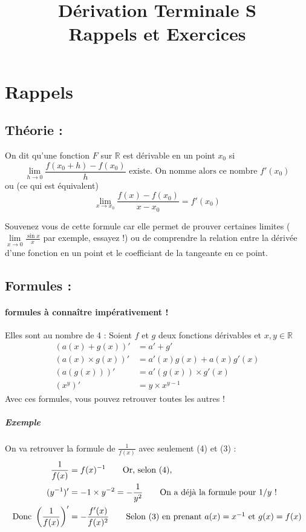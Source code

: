 \documentclass[11pt]{article}
\title{Dérivation Terminale S\\
        \large Rappels et Exercices}
\date{}
\author{}
\newcommand{\R}{\mathbb R}
\begin{document}
    
    \maketitle
    
    \section{Rappels}
        \subsection{Théorie :}
        On dit qu'une fonction $F$ sur $\R$ est dérivable en un point $x_0$ si
        \begin{equation}
            \lim\limits_{h \to 0} \frac{f(x_0 + h)-f(x_0)}{h} \text{ existe. On nomme alors ce nombre $f'(x_0)$} 
        \end{equation}
        ou (ce qui est équivalent)
        \begin{equation*}
            \lim\limits_{x \to x_0} \frac{f(x)-f(x_0)}{x-x_0} = f'(x_0)            
        \end{equation*}

        Souvenez vous de cette formule car elle permet de prouver certaines limites ($\lim\limits_{x \to 0} \frac{\sin{x}}{x}$ par exemple, essayez !) ou de comprendre la relation entre la dérivée d'une fonction en un point et le coefficiant de la tangeante en ce point.

        \subsection{Formules :}
        \paragraph{formules à connaître impérativement !}
        Elles sont au nombre de 4 : Soient $f$ et $g$ deux fonctions dérivables et $x,y \in  \R $
        \begin{align}
            (a(x) + g(x))' &= a' +g'\\
            (a(x) \times g(x))' &= a'(x)g(x) + a(x)g'(x)\\
            (a(g(x)))' &= a'(g(x))\times g'(x)\\
            (x^y)' &= y\times x^{y-1}
        \end{align}
        Avec ces formules, vous pouvez retrouver toutes les autres !
        \subparagraph{Exemple} On va retrouver la formule de $\frac{1}{f(x)}$ avec seulement (4) et (3) :
        \begin{align*}
            \frac{1}{f(x)} &= f(x)^{-1} \tag*{Or, selon (4),}\\ 
            (y^{-1})' &= -1\times y^{-2} =-\frac{1}{y^2} \tag*{On a déjà la formule pour $1/y$ !}\\
            \text{Donc } \left(\frac{1}{f(x)}\right)' &=- \frac{f'(x)}{f(x)^2} \tag*{Selon (3) en prenant $a(x)=x^{-1}$ et $g(x)=f(x)$} 
        \end{align*}
\end{document}
